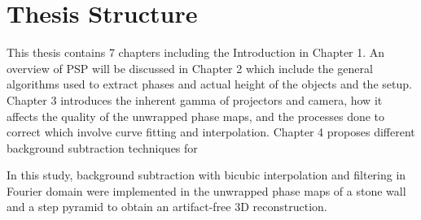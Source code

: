 \section{Thesis Structure}

This thesis contains 7 chapters including the Introduction in Chapter 1. An overview of PSP will be discussed in Chapter 2 which include the general algorithms used to extract phases and actual height of the objects and the setup. Chapter 3 introduces the inherent gamma of projectors and camera, how it affects the quality of the unwrapped phase maps, and the processes done to correct which involve curve fitting and interpolation. Chapter 4 proposes different background subtraction techniques for 

In this study, background subtraction with bicubic interpolation and filtering in Fourier domain were implemented in the unwrapped phase maps of a stone wall and a step pyramid to obtain an artifact-free 3D reconstruction.


